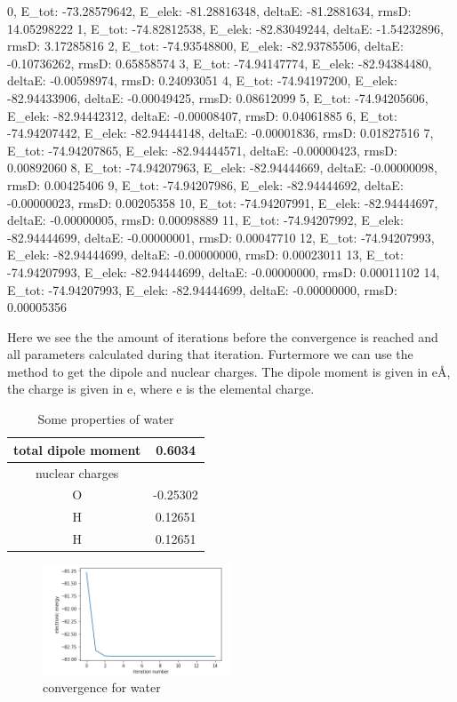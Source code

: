 \begin{python}[caption={iterations for water},label={ls:Listing 7},basicstyle=\scriptsize]
0, E_tot: -73.28579642, E_elek: -81.28816348, deltaE: -81.2881634, rmsD:  14.05298222
1, E_tot: -74.82812538, E_elek: -82.83049244, deltaE: -1.54232896, rmsD:  3.17285816 
2, E_tot: -74.93548800, E_elek: -82.93785506, deltaE: -0.10736262, rmsD:  0.65858574 
3, E_tot: -74.94147774, E_elek: -82.94384480, deltaE: -0.00598974, rmsD:  0.24093051 
4, E_tot: -74.94197200, E_elek: -82.94433906, deltaE: -0.00049425, rmsD:  0.08612099
5, E_tot: -74.94205606, E_elek: -82.94442312, deltaE: -0.00008407, rmsD:  0.04061885
6, E_tot: -74.94207442, E_elek: -82.94444148, deltaE: -0.00001836, rmsD:  0.01827516
7, E_tot: -74.94207865, E_elek: -82.94444571, deltaE: -0.00000423, rmsD:  0.00892060
8, E_tot: -74.94207963, E_elek: -82.94444669, deltaE: -0.00000098, rmsD:  0.00425406
9, E_tot: -74.94207986, E_elek: -82.94444692, deltaE: -0.00000023, rmsD:  0.00205358
10, E_tot: -74.94207991, E_elek: -82.94444697, deltaE: -0.00000005, rmsD:  0.00098889
11, E_tot: -74.94207992, E_elek: -82.94444699, deltaE: -0.00000001, rmsD:  0.00047710
12, E_tot: -74.94207993, E_elek: -82.94444699, deltaE: -0.00000000, rmsD:  0.00023011
13, E_tot: -74.94207993, E_elek: -82.94444699, deltaE: -0.00000000, rmsD:  0.00011102
14, E_tot: -74.94207993, E_elek: -82.94444699, deltaE: -0.00000000, rmsD:  0.00005356
\end{python}
Here we see the the amount of iterations before the convergence is reached and 
all parameters calculated during that iteration. Furtermore we can use the 
 method to get the dipole and nuclear charges. The dipole 
moment is given in e\AA, the charge is given in e, where e is the elemental 
charge.

\begin{table}[ht]
    \centering
    \begin{tabular}{c|c}
         total dipole moment & 0.6034  \\
         \hline
         nuclear charges &  \\ 
         \hline
         O & -0.25302 \\
         H & 0.12651 \\
         H & 0.12651 \\
    \end{tabular}
    \caption{Some properties of water}
    \label{tab:number2}
\end{table}

\begin{figure}
    \centering
    \includegraphics[width=0.5\textwidth]{content/Capture.PNG}
    \caption{convergence for water}
    \label{fig:convergence1}

\end{figure}
